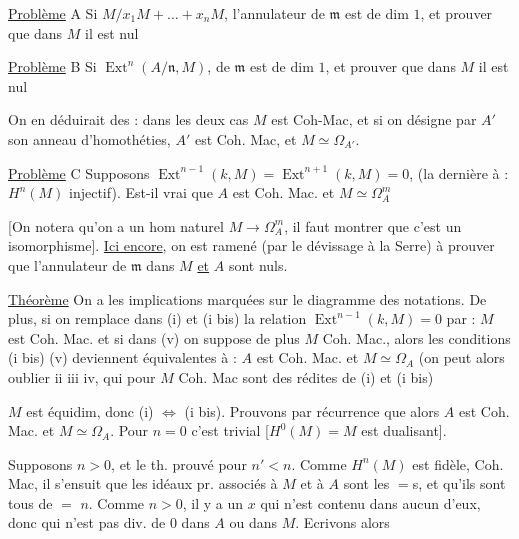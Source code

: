 \uline{Problème} A Si  $M/x_1M+\ldots+x_nM$, l'annulateur de $\mathfrak m$ est de dim $1$, et  prouver que dans $M$ il est nul

\uline{Problème} B Si  $\operatorname{Ext}^n(A/\mathfrak n,M)$,  de $\mathfrak m$ est de dim $1$, et  prouver que dans $M$  il est nul

On en déduirait des  : dans les deux cas $M$ est Coh-Mac, et si on désigne par $A'$ son anneau d'homothéties, $A'$ est Coh. Mac, et $M\simeq\Omega_{A'}$.

\uline{Problème} C Supposons  $\operatorname{Ext}^{n-1}(k,M)=\operatorname{Ext}^{n+1}(k,M)=0$, (la dernière   à : $H^n(M)$ injectif).  Est-il vrai que $A$ est Coh. Mac. et $M\simeq\Omega_A^{m}$

[On notera qu'on a un hom naturel $M\to\Omega_A^{m}$, il faut montrer que c'est un isomorphisme]. \uline{Ici encore}, on est ramené (par le dévissage à la Serre) à prouver que l'annulateur de $\mathfrak m$ dans $M$ \uline{et} $A$  sont nuls.

\uline{Théorème} On a les implications marquées sur le diagramme des notations. De plus, si on remplace dans (i) et (i bis) la relation $\operatorname{Ext}^{n-1}(k,M)=0$ par : $M$ est Coh. Mac. et si dans (v) on suppose de plus $M$ Coh. Mac., alors  les conditions  (i bis) (v) deviennent équivalentes à : $A$ est Coh. Mac. et $M\simeq\Omega_A$ (on peut alors oublier ii iii iv, qui pour $M$ Coh. Mac sont des rédites de (i) et (i bis)

$M$ est équidim, donc (i) $\Leftrightarrow$ (i bis). Prouvons par récurrence que alors $A$ est Coh. Mac. et $M\simeq\Omega_A$. Pour $n=0$ c'est trivial [$H^0(M)=M$ est dualisant].

Supposons $n>0$, et le th. prouvé pour $n'<n$.  Comme $H^n(M)$ est fidèle,   Coh. Mac, il s'ensuit que les idéaux pr. associés à $M$ et à $A$ sont les $=$s, et qu'ils sont tous de $=$   $n$. Comme $n>0$, il y a un $x$ qui n'est contenu dans aucun d'eux, donc qui n'est pas div. de $0$ dans $A$ ou dans $M$.  Ecrivons alors

